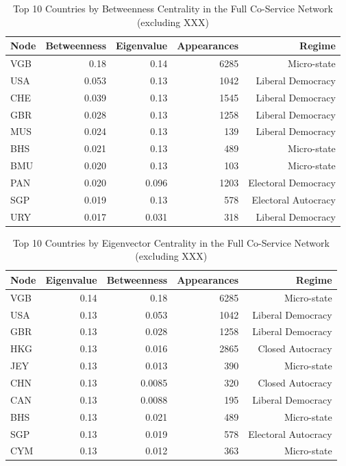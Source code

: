 \begin{table}[htbp]
\centering
\caption{Top 10 Countries by Betweenness Centrality in the Full Co-Service Network (excluding XXX)}
\label{tab:appendix_country_betweenness_app}
\begin{tabular}{lrrrr}
\toprule
Node & Betweenness & Eigenvalue & Appearances & Regime              \\
\midrule
VGB  & 0.18    & 0.14    & 6285        & Micro-state         \\
USA  & 0.053    & 0.13    & 1042        & Liberal Democracy   \\
CHE  & 0.039    & 0.13    & 1545        & Liberal Democracy   \\
GBR  & 0.028    & 0.13    & 1258        & Liberal Democracy   \\
MUS  & 0.024    & 0.13    & 139         & Liberal Democracy   \\
BHS  & 0.021    & 0.13    & 489         & Micro-state         \\
BMU  & 0.020    & 0.13    & 103         & Micro-state         \\
PAN  & 0.020    & 0.096    & 1203        & Electoral Democracy \\
SGP  & 0.019    & 0.13    & 578         & Electoral Autocracy \\
URY  & 0.017    & 0.031    & 318         & Liberal Democracy   \\
\bottomrule
\end{tabular}
\end{table}

\begin{table}[htbp]
\centering
\caption{Top 10 Countries by Eigenvector Centrality in the Full Co-Service Network (excluding XXX)}
\label{tab:appendix_country_eigenvector_app}
\begin{tabular}{lrrrr}
\toprule
Node & Eigenvalue & Betweenness & Appearances & Regime              \\
\midrule
VGB  & 0.14    & 0.18    & 6285        & Micro-state         \\
USA  & 0.13    & 0.053    & 1042        & Liberal Democracy   \\
GBR  & 0.13    & 0.028    & 1258        & Liberal Democracy   \\
HKG  & 0.13    & 0.016    & 2865        & Closed Autocracy    \\
JEY  & 0.13    & 0.013    & 390         & Micro-state         \\
CHN  & 0.13    & 0.0085    & 320         & Closed Autocracy    \\
CAN  & 0.13    & 0.0088    & 195         & Liberal Democracy   \\
BHS  & 0.13    & 0.021    & 489         & Micro-state         \\
SGP  & 0.13    & 0.019    & 578         & Electoral Autocracy \\
CYM  & 0.13    & 0.012    & 363         & Micro-state         \\
\bottomrule
\end{tabular}
\end{table}

